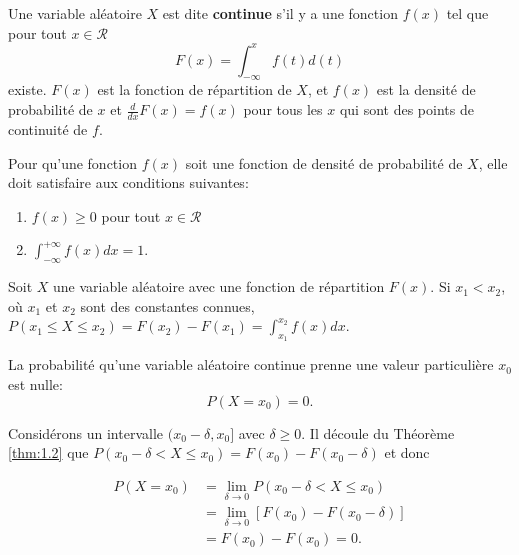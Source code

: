 \theoremstyle{definition}
\begin{definition}{}\label{def:vacont}
Une variable aléatoire $ X $ est dite \textbf{continue} s'il y a une fonction
$ f (x) $ tel que pour tout $ x \in \mathcal {R} $
\begin{equation}
F(x) = \int_{-\infty}^{x}f(t)d(t)
\end{equation}
existe. $F(x)$ est la fonction de répartition de $X$, et $f(x)$  est la densité de probabilité de $x$ et
$\frac{d}{dx}F(x)=f(x)$ pour tous les $x$ qui sont des points de continuité de $f$.
\end{definition}
\theoremstyle{theorem}
\begin{theorem}{}\label{thm:1.1}
Pour qu'une fonction $ f (x) $ soit une fonction de densité de probabilité de $ X $, elle doit satisfaire aux
conditions suivantes:
\begin{enumerate}
\item $f(x)\geq0$ pour tout $x\in\mathcal{R}$
\item $\int_{-\infty}^{+\infty}f(x)dx=1$.
\end{enumerate}
\end{theorem}

\theoremstyle{theorem}
\begin{theorem}{}\label{thm:1.2}
Soit $ X $ une variable aléatoire avec une fonction de répartition $ F (x) $. Si $ x_1 <x_2 $,
où $ x_1 $ et $ x_2 $ sont des constantes connues,
$ P (x_1 \leq X \leq x_2) = F (x_2) - F (x_1) = \int_ {x_1} ^ {x_2} f (x) dx $.
\end{theorem}

\theoremstyle{theorem}
\begin{theorem}\label{thm:1.3}
La probabilité qu'une variable aléatoire continue prenne une valeur particulière $ x_0 $ est nulle:
\begin{equation}
P(X=x_0)=0.
\end{equation}
\end{theorem}
\begin{pruf}
Considérons un intervalle $(x_0-\delta,x_0]$ avec $\delta\geq0$. Il découle du Théorème \ref{thm:1.2} que
$P(x_0-\delta<X\leq x_0)=F(x_0)-F(x_0-\delta)$ et donc

\begin{align*}
P(X=x_0) & = \lim_{\delta\to0}P(x_0 -\delta<X\leq x_0)\\&= \lim_{\delta\to0}[F(x_0) - F(x_0 -\delta)]\\&= F(x_0) - F(x_0) =0.
\end{align*}
\end{pruf}

